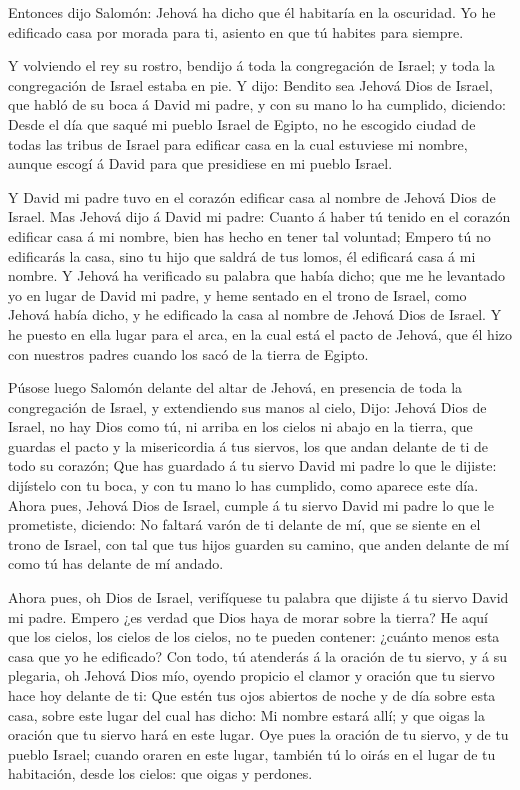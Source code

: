  Entonces dijo Salomón: Jehová ha dicho que él habitaría en
la oscuridad.  Yo he edificado casa por morada para ti,
asiento en que tú habites para siempre.

 Y volviendo el rey su rostro, bendijo á toda la
congregación de Israel; y toda la congregación de Israel estaba en pie.
 Y dijo: Bendito sea Jehová Dios de Israel, que habló de su
boca á David mi padre, y con su mano lo ha cumplido, diciendo:
 Desde el día que saqué mi pueblo Israel de Egipto, no he
escogido ciudad de todas las tribus de Israel para edificar casa en la
cual estuviese mi nombre, aunque escogí á David para que presidiese en
mi pueblo Israel.

 Y David mi padre tuvo en el corazón edificar casa al
nombre de Jehová Dios de Israel.  Mas Jehová dijo á David
mi padre: Cuanto á haber tú tenido en el corazón edificar casa á mi
nombre, bien has hecho en tener tal voluntad;  Empero tú no
edificarás la casa, sino tu hijo que saldrá de tus lomos, él edificará
casa á mi nombre.  Y Jehová ha verificado su palabra que
había dicho; que me he levantado yo en lugar de David mi padre, y heme
sentado en el trono de Israel, como Jehová había dicho, y he edificado
la casa al nombre de Jehová Dios de Israel.  Y he puesto en
ella lugar para el arca, en la cual está el pacto de Jehová, que él hizo
con nuestros padres cuando los sacó de la tierra de Egipto.

 Púsose luego Salomón delante del altar de Jehová, en
presencia de toda la congregación de Israel, y extendiendo sus manos al
cielo,  Dijo: Jehová Dios de Israel, no hay Dios como tú,
ni arriba en los cielos ni abajo en la tierra, que guardas el pacto y la
misericordia á tus siervos, los que andan delante de ti de todo su
corazón;  Que has guardado á tu siervo David mi padre lo
que le dijiste: dijístelo con tu boca, y con tu mano lo has cumplido,
como aparece este día.  Ahora pues, Jehová Dios de Israel,
cumple á tu siervo David mi padre lo que le prometiste, diciendo: No
faltará varón de ti delante de mí, que se siente en el trono de Israel,
con tal que tus hijos guarden su camino, que anden delante de mí como tú
has delante de mí andado.

 Ahora pues, oh Dios de Israel, verifíquese tu palabra que
dijiste á tu siervo David mi padre.  Empero ¿es verdad que
Dios haya de morar sobre la tierra? He aquí que los cielos, los cielos
de los cielos, no te pueden contener: ¿cuánto menos esta casa que yo he
edificado?  Con todo, tú atenderás á la oración de tu
siervo, y á su plegaria, oh Jehová Dios mío, oyendo propicio el clamor y
oración que tu siervo hace hoy delante de ti:  Que estén
tus ojos abiertos de noche y de día sobre esta casa, sobre este lugar
del cual has dicho: Mi nombre estará allí; y que oigas la oración que tu
siervo hará en este lugar.  Oye pues la oración de tu
siervo, y de tu pueblo Israel; cuando oraren en este lugar, también tú
lo oirás en el lugar de tu habitación, desde los cielos: que oigas y
perdones.

